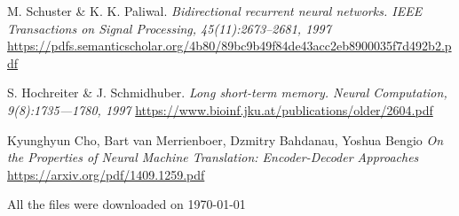 \documentclass[licencjacka,en]{pracamgr}
\newcommand{\bibDownloadDate}{\today}
\begin{document}
\begin{thebibliography}{99}
 M. Schuster \& K. K. Paliwal. \textit{Bidirectional recurrent neural networks. IEEE Transactions on Signal Processing, 45(11):2673–2681, 1997} \href{https://pdfs.semanticscholar.org/4b80/89bc9b49f84de43acc2eb8900035f7d492b2.pdf}{https://pdfs.semanticscholar.org/4b80/89bc9b49f84de43acc2eb8900035f7d492b2.pdf}

 S. Hochreiter \& J. Schmidhuber. \textit{Long short-term memory. Neural Computation, 9(8):1735—1780, 1997} \href{https://www.bioinf.jku.at/publications/older/2604.pdf}{https://www.bioinf.jku.at/publications/older/2604.pdf}

 Kyunghyun Cho, Bart van Merrienboer, Dzmitry Bahdanau, Yoshua Bengio \textit{On the Properties of Neural Machine Translation: Encoder-Decoder Approaches} \href{https://arxiv.org/pdf/1409.1259.pdf}{https://arxiv.org/pdf/1409.1259.pdf}

\end{thebibliography}
All the files were downloaded on \bibDownloadDate
\end{document}

